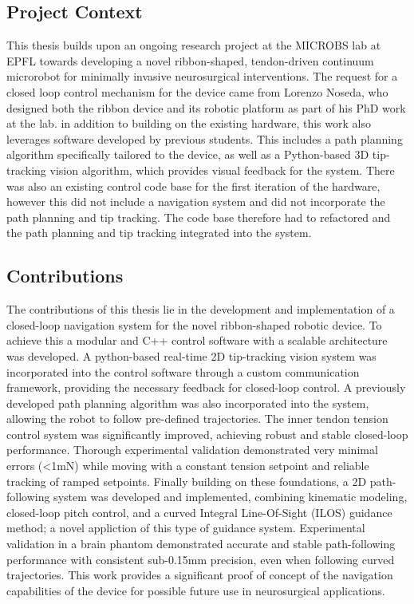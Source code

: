 \subsection{Project Context}

This thesis builds upon an ongoing research project at the MICROBS lab at EPFL towards developing a novel ribbon-shaped, tendon-driven continuum microrobot for minimally invasive neurosurgical interventions. The request for a closed loop control mechanism for the device came from Lorenzo Noseda, who designed both the ribbon device and its robotic platform as part of his PhD work at the lab. 
\newline \newline
in addition to building on the existing hardware, this work also leverages software developed by previous students. This includes a path planning algorithm specifically tailored to the device, as well as a Python-based 3D tip-tracking vision algorithm, which provides visual feedback for the system. There was also an existing control code base for the first iteration of the hardware, however this did not include a navigation system and did not incorporate the path planning and tip tracking. The code base therefore had to refactored and the path planning and tip tracking integrated into the system.


\subsection{Contributions}
The contributions of this thesis lie in the development and implementation of a closed-loop navigation system for the novel ribbon-shaped robotic device. To achieve this a modular and C++ control software with a scalable architecture was developed. A python-based real-time 2D tip-tracking vision system was incorporated into the control software through a custom communication framework, providing the necessary feedback for closed-loop control. A previously developed path planning algorithm was also incorporated into the system, allowing the robot to follow pre-defined trajectories.
\newline \newline
The inner tendon tension control system was significantly improved, achieving robust and stable closed-loop performance. Thorough experimental validation demonstrated very minimal errors (<1mN) while moving with a constant tension setpoint and reliable tracking of ramped setpoints.
\newline \newline
Finally building on these foundations, a 2D path-following system was developed and implemented, combining kinematic modeling, closed-loop pitch control, and a curved Integral Line-Of-Sight (ILOS) guidance method; a novel appliction of this type of guidance system. Experimental validation in a brain phantom demonstrated accurate and stable path-following performance with consistent sub-0.15mm precision, even when following curved trajectories. This work provides a significant proof of concept of the navigation capabilities of the device for possible future use in neurosurgical applications.


